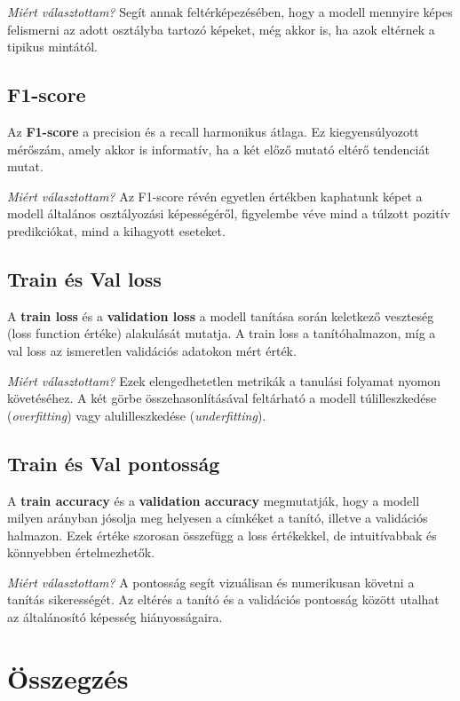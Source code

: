 \textit{Miért választottam?}  
Segít annak feltérképezésében, hogy a modell mennyire képes felismerni az adott osztályba tartozó képeket, még akkor is, ha azok eltérnek a tipikus mintától.

\subsection{F1-score}

Az \textbf{F1-score} a precision és a recall harmonikus átlaga. Ez kiegyensúlyozott mérőszám, amely akkor is informatív, ha a két előző mutató eltérő tendenciát mutat.

\textit{Miért választottam?}  
Az F1-score révén egyetlen értékben kaphatunk képet a modell általános osztályozási képességéről, figyelembe véve mind a túlzott pozitív predikciókat, mind a kihagyott eseteket.

\subsection{Train és Val loss}

A \textbf{train loss} és a \textbf{validation loss} a modell tanítása során keletkező veszteség (loss function értéke) alakulását mutatja. A train loss a tanítóhalmazon, míg a val loss az ismeretlen validációs adatokon mért érték.

\textit{Miért választottam?}  
Ezek elengedhetetlen metrikák a tanulási folyamat nyomon követéséhez. A két görbe összehasonlításával feltárható a modell túlilleszkedése (\textit{overfitting}) vagy alulilleszkedése (\textit{underfitting}).

\subsection{Train és Val pontosság}

A \textbf{train accuracy} és a \textbf{validation accuracy} megmutatják, hogy a modell milyen arányban jósolja meg helyesen a címkéket a tanító, illetve a validációs halmazon. Ezek értéke szorosan összefügg a loss értékekkel, de intuitívabbak és könnyebben értelmezhetők.

\textit{Miért választottam?}  
A pontosság segít vizuálisan és numerikusan követni a tanítás sikerességét. Az eltérés a tanító és a validációs pontosság között utalhat az általánosító képesség hiányosságaira.

\section{Összegzés}


